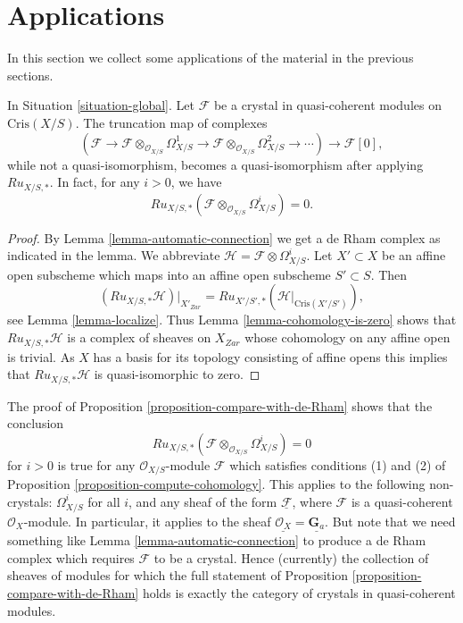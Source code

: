 \section{Applications}
\label{section-applications}

\noindent
In this section we collect some applications of the material in
the previous sections.

\begin{proposition}
\label{proposition-compare-with-de-Rham}
In Situation \ref{situation-global}.
Let $\mathcal{F}$ be a crystal in quasi-coherent modules on
$\text{Cris}(X/S)$. The truncation map of complexes
$$
(\mathcal{F} \to
\mathcal{F} \otimes_{\mathcal{O}_{X/S}} \Omega^1_{X/S} \to
\mathcal{F} \otimes_{\mathcal{O}_{X/S}} \Omega^2_{X/S} \to \cdots)
\longrightarrow \mathcal{F}[0],
$$
while not a quasi-isomorphism, becomes a quasi-isomorphism after applying
$Ru_{X/S, *}$. In fact, for any $i > 0$, we have 
$$
Ru_{X/S, *}(\mathcal{F} \otimes_{\mathcal{O}_{X/S}} \Omega^i_{X/S}) = 0.
$$
\end{proposition}

\begin{proof}
By Lemma \ref{lemma-automatic-connection} we get a de Rham complex
as indicated in the lemma. We abbreviate
$\mathcal{H} = \mathcal{F} \otimes \Omega^i_{X/S}$.
Let $X' \subset X$ be an affine open
subscheme which maps into an affine open subscheme $S' \subset S$.
Then
$$
(Ru_{X/S, *}\mathcal{H})|_{X'_{Zar}} =
Ru_{X'/S', *}(\mathcal{H}|_{\text{Cris}(X'/S')}),
$$
see Lemma \ref{lemma-localize}. Thus
Lemma \ref{lemma-cohomology-is-zero}
shows that $Ru_{X/S, *}\mathcal{H}$ is a complex of sheaves on
$X_{Zar}$ whose cohomology on any affine open is trivial.
As $X$ has a basis for its topology consisting of affine opens
this implies that $Ru_{X/S, *}\mathcal{H}$ is quasi-isomorphic to zero.
\end{proof}

\begin{remark}
\label{remark-vanishing}
The proof of Proposition \ref{proposition-compare-with-de-Rham}
shows that the conclusion
$$
Ru_{X/S, *}(\mathcal{F} \otimes_{\mathcal{O}_{X/S}} \Omega^i_{X/S}) = 0
$$
for $i > 0$ is true for any $\mathcal{O}_{X/S}$-module
$\mathcal{F}$ which satisfies conditions (1) and (2) of
Proposition \ref{proposition-compute-cohomology}.
This applies to the following non-crystals:
$\Omega^i_{X/S}$ for all $i$, and any sheaf of the form
$\underline{\mathcal{F}}$, where $\mathcal{F}$ is a quasi-coherent
$\mathcal{O}_X$-module. In particular, it applies to the
sheaf $\underline{\mathcal{O}_X} = \underline{\mathbf{G}_a}$.
But note that we need something like Lemma \ref{lemma-automatic-connection}
to produce a de Rham complex which requires $\mathcal{F}$ to be a crystal.
Hence (currently) the collection of sheaves of modules for which the full
statement of Proposition \ref{proposition-compare-with-de-Rham} holds
is exactly the category of crystals in quasi-coherent modules.
\end{remark}

